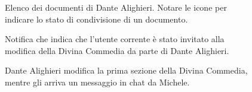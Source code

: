 \begin{center}
	\begin{figure}[ht!]
		\caption{Elenco dei documenti di Dante Alighieri. Notare le icone per indicare lo stato di condivisione di un documento.}
	\end{figure}

	\begin{figure}[ht!]
		\caption{Notifica che indica che l'utente corrente è stato invitato alla modifica della Divina Commedia da parte di Dante Alighieri.}
	\end{figure}

	\begin{figure}[ht!]
		\caption{Dante Alighieri modifica la prima sezione della Divina Commedia, mentre gli arriva un messaggio in chat da Michele.}
	\end{figure}
\end{center}

\newpage
